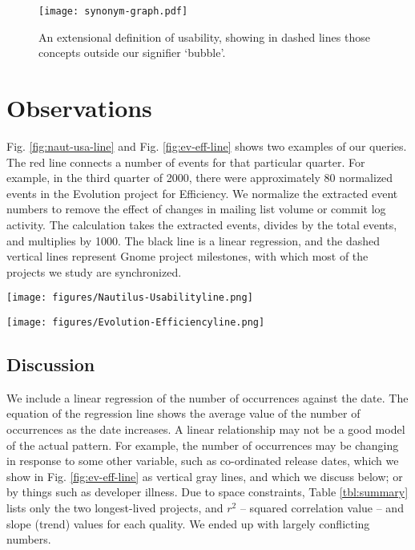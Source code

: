 \documentclass[conference, compsoc]{IEEEtran}
\begin{document}
\begin{figure}[b]
\centering
\texttt{[image: synonym-graph.pdf]}
\caption{An extensional definition of usability, showing in dashed lines those concepts outside our signifier `bubble'.}
\label{fig:syngraph}
\end{figure}

\section{Observations}
\label{sec:observations}
Fig. \ref{fig:naut-usa-line} and Fig. \ref{fig:ev-eff-line} shows two examples of our queries. The red line connects a number of events for that particular quarter. For example, in the third quarter of 2000, there were approximately 80 normalized events in the Evolution project for Efficiency. We normalize the extracted event numbers to remove the effect of changes in mailing list volume or commit log activity. The calculation takes the extracted events, divides by the total events, and multiplies by 1000. The black line is a linear regression, and the dashed vertical lines represent Gnome project milestones, with which most of the projects we study are synchronized.

\begin{figure*}[ht]
\begin{minipage}[]{0.5\textwidth}
\centering
\texttt{[image: figures/Nautilus-Usabilityline.png]} 
\label{fig:naut-usa-line}
\caption{Product: Nautilus, Quality: Usability}
\end{minipage}%
\hspace{0.2cm}
\begin{minipage}[]{0.5\textwidth}
\centering
\texttt{[image: figures/Evolution-Efficiencyline.png]}
\label{fig:ev-eff-line}
\caption{Product: Evolution, Quality: Efficiency}
\end{minipage}
\end{figure*}

\vspace{-2mm}
\subsection{Discussion}
\vspace{-2mm}

We include a linear regression of the number of occurrences against the date. The equation of the regression line shows the average value of the number of occurrences as the date increases. A linear relationship may not be a good model of the actual pattern. For example, the number of occurrences may be changing in response to some other variable, such as co-ordinated release dates, which we show in Fig. \ref{fig:ev-eff-line} as vertical gray lines, and which we discuss below; or by things such as developer illness. Due to space constraints, Table \ref{tbl:summary} lists only the two longest-lived projects, and $r^2$  -- squared correlation value -- and slope (trend) values for each quality. We ended up with largely conflicting numbers. 
\end{document}
